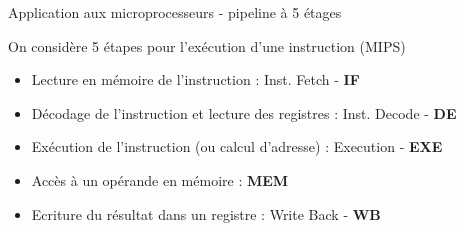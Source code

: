 %
\begin{Frame}{Application aux microprocesseurs - pipeline à 5 étages}

\begin{block}{On considère 5 étapes pour l'exécution d'une instruction (MIPS)}
       \begin{center}
 	\begin{itemize}
         \item Lecture en mémoire de l'instruction : Inst. Fetch - \textbf{IF}
	 \item Décodage de l'instruction et lecture des registres : Inst. Decode - \textbf{DE}
	\item Exécution de l'instruction (ou calcul d'adresse) : Execution - \textbf{EXE}
	\item Accès à un opérande en mémoire : \textbf{MEM}
	\item Ecriture du résultat dans un registre : Write Back - \textbf{WB}
        \end{itemize}
       \end{center}
      \end{block}   
 

\vspace{-0.85cm}
        \begin{center}
        \end{center}
      
\end{Frame}


